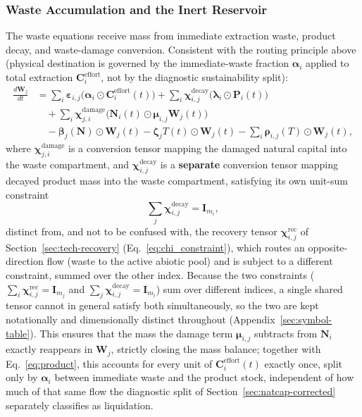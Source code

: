 \documentclass[twocolumn,10pt]{article}
\begin{document}
\subsubsection{Waste Accumulation and the Inert Reservoir}
The waste equations receive mass from immediate extraction waste, product decay, and waste-damage conversion. Consistent with the routing principle above (physical destination is governed by the immediate-waste fraction $\boldsymbol\alpha_i$ applied to total extraction $\mathbf C_i^{\text{effort}}$, not by the diagnostic sustainability split):
\begin{align}
\frac{d\mathbf{W}_j}{dt} &= \sum_i \boldsymbol{\varepsilon}_{i,j} \bigl( \boldsymbol{\alpha}_i \odot \mathbf{C}_i^{\text{effort}}(t) \bigr)
   + \sum_i \boldsymbol{\chi}^{\text{decay}}_{i,j} \bigl( \boldsymbol{\lambda}_i \odot \mathbf{P}_i(t) \bigr) \nonumber\\
   &\quad + \sum_i \boldsymbol{\chi}^{\text{damage}}_{j,i} \bigl( \mathbf{N}_i(t) \odot \boldsymbol{\mu}_{i,j} \mathbf{W}_j(t) \bigr) \nonumber\\
   &\quad - \boldsymbol{\beta}_j(\mathbf{N}) \odot \mathbf{W}_j(t)
   - \boldsymbol{\zeta}_j T(t) \odot \mathbf{W}_j(t)
   - \sum_i \boldsymbol{\rho}_{i,j}(T) \odot \mathbf{W}_j(t),
\label{eq:wvec-corrected}
\end{align}
where \(\boldsymbol{\chi}^{\text{damage}}_{j,i}\) is a conversion tensor mapping the damaged natural capital into the waste compartment, and \(\boldsymbol{\chi}^{\text{decay}}_{i,j}\) is a \textbf{separate} conversion tensor mapping decayed product mass into the waste compartment, satisfying its own unit-sum constraint
\begin{equation}
\sum_j \boldsymbol{\chi}^{\text{decay}}_{i,j} = \mathbf{I}_{m_i}, \label{eq:chidecay_constraint}
\end{equation}
distinct from, and not to be confused with, the recovery tensor $\boldsymbol\chi^{\text{rec}}_{i,j}$ of Section~\ref{sec:tech-recovery} (Eq.~\eqref{eq:chi_constraint}), which routes an opposite-direction flow (waste to the active abiotic pool) and is subject to a different constraint, summed over the other index. Because the two constraints ($\sum_i\boldsymbol\chi^{\text{rec}}_{i,j}=\mathbf I_{m_j}$ and $\sum_j\boldsymbol\chi^{\text{decay}}_{i,j}=\mathbf I_{m_i}$) sum over different indices, a single shared tensor cannot in general satisfy both simultaneously, so the two are kept notationally and dimensionally distinct throughout (Appendix~\ref{sec:symbol-table}). This ensures that the mass the damage term \(\boldsymbol{\mu}_{i,j}\) subtracts from \(\mathbf{N}_i\) exactly reappears in \(\mathbf{W}_j\), strictly closing the mass balance; together with Eq.~\eqref{eq:product}, this accounts for every unit of $\mathbf C_i^{\text{effort}}(t)$ exactly once, split only by $\boldsymbol\alpha_i$ between immediate waste and the product stock, independent of how much of that same flow the diagnostic split of Section~\ref{sec:natcap-corrected} separately classifies as liquidation.
\end{document}
